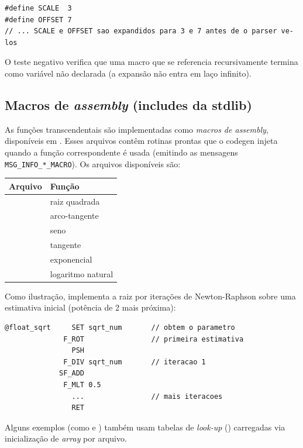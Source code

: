 \begin{lstlisting}[style=cmm]
#define SCALE  3
#define OFFSET 7
// ... SCALE e OFFSET sao expandidos para 3 e 7 antes de o parser ve-los
\end{lstlisting}

O teste negativo  verifica que uma macro que
se referencia recursivamente termina como variável não declarada (a expansão não
entra em laço infinito).

\subsection{Macros de \emph{assembly} (includes da stdlib)}

As funções transcendentais são implementadas como \emph{macros de assembly},
disponíveis em . Esses arquivos contêm rotinas
prontas que o codegen injeta quando a função correspondente é usada (emitindo as
mensagens \lstinline|MSG_INFO_*_MACRO|). Os arquivos disponíveis são:

\begin{tabularx}{\linewidth}{Y Y}
\toprule
\textbf{Arquivo} & \textbf{Função} \\
\midrule
{} & raiz quadrada \\
 & arco-tangente \\
 & seno \\
 & tangente \\
 & exponencial \\
 & logaritmo natural \\
\bottomrule
\end{tabularx}

Como ilustração,  implementa a raiz por iterações de
Newton-Raphson sobre uma estimativa inicial (potência de 2 mais próxima):

\begin{lstlisting}[language=bash]
@float_sqrt     SET sqrt_num       // obtem o parametro
              F_ROT                // primeira estimativa
                PSH
              F_DIV sqrt_num       // iteracao 1
             SF_ADD
              F_MLT 0.5
                ...                // mais iteracoes
                RET
\end{lstlisting}

Alguns exemplos (como  e ) também usam
tabelas de \emph{look-up} () carregadas via inicialização de
\emph{array} por arquivo.

